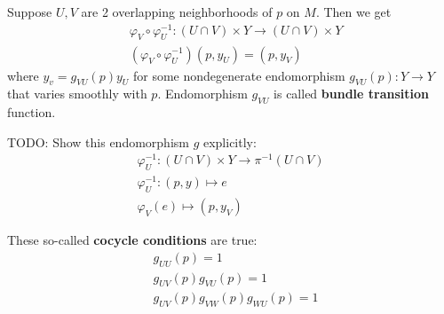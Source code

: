 Suppose $U,V$ are 2 overlapping neighborhoods of $p$ on $M$. Then we get
\begin{equation}
\begin{aligned}
& \varphi_V \circ \varphi_U^{-1} : (U \cap V) \times Y \to (U \cap V) \times Y \\
& (\varphi_V \circ \varphi_U^{-1}) (p, y_U) = (p, y_V)
\end{aligned}
\end{equation}
where $y_v= g_{VU}(p) y_U$ for some nondegenerate endomorphism $g_{VU}(p) : Y \to Y$ that varies smoothly with $p$. Endomorphism $g_{VU}$ is called \textbf{bundle transition} function.

TODO: Show this endomorphism $g$ explicitly:
\[
\begin{gathered}
\varphi_U^{-1}: (U \cap V) \times Y \to \pi^{-1}(U \cap V) \\
\varphi_U^{-1}: (p, y) \mapsto e \\
\varphi_V(e) \mapsto (p, y_V)
\end{gathered}
\]

\begin{corollary}
These so-called \textbf{cocycle conditions} are true:
\begin{equation}
\begin{aligned}
& g_{UU}(p) = 1 \\
& g_{UV}(p) g_{VU}(p) = 1 \\
& g_{UV}(p) g_{VW}(p) g_{WU}(p) = 1
\end{aligned}
\end{equation}
\end{corollary}

